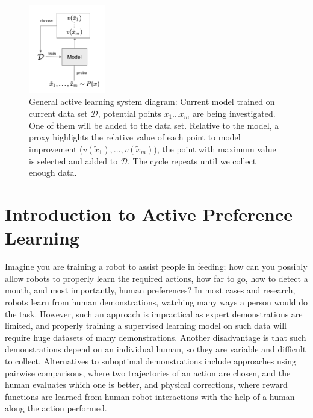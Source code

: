 \documentclass[
  letterpaper,
  DIV=11,
  numbers=noendperiod,
  oneside]{scrreprt}
\theoremstyle{remark}
\begin{document}
\begin{figure}

{\centering \includegraphics[width=0.3\textwidth,height=\textheight]{src/Figures/active_learning_schema.png}

}

\caption{General active learning system diagram: Current model trained
on current data set \(\mathcal{D}\), potential points
\(\tilde{x}_1...\tilde{x}_m\) are being investigated. One of them will
be added to the data set. Relative to the model, a proxy highlights the
relative value of each point to model improvement
(\(v(\tilde{x}_1), \ldots, v(\tilde{x}_m)\)), the point with maximum
value is selected and added to \(\mathcal{D}\). The cycle repeats until
we collect enough data.}

\end{figure}%

\section{Introduction to Active Preference
Learning}\label{introduction-to-active-preference-learning}

Imagine you are training a robot to assist people in feeding; how can
you possibly allow robots to properly learn the required actions, how
far to go, how to detect a mouth, and most importantly, human
preferences? In most cases and research, robots learn from human
demonstrations, watching many ways a person would do the task. However,
such an approach is impractical as expert demonstrations are limited,
and properly training a supervised learning model on such data will
require huge datasets of many demonstrations. Another disadvantage is
that such demonstrations depend on an individual human, so they are
variable and difficult to collect. Alternatives to suboptimal
demonstrations include approaches using pairwise comparisons, where two
trajectories of an action are chosen, and the human evaluates which one
is better, and physical corrections, where reward functions are learned
from human-robot interactions with the help of a human along the action
performed.
\end{document}

